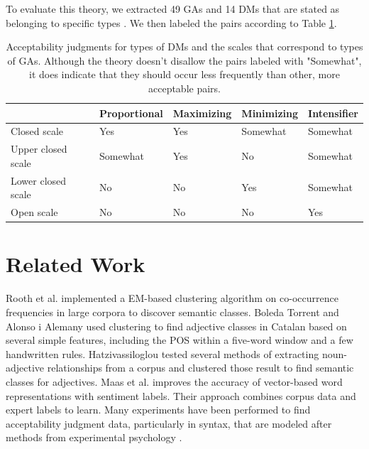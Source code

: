 \documentclass[11pt]{article}
\begin{document}
To evaluate this theory, we extracted 49 GAs and 14 DMs that are stated as belonging to specific types \cite{kennedymcnally} \cite{kennedy07}. We then labeled the pairs according to Table \ref{tab:theory-table}.

\begin{center}
\begin{table}[ht]
\hfill{}
\begin{tabular}{|l|l|l|l|l|}
\hline & \bf Proportional & \bf Maximizing & \bf Minimizing & \bf Intensifier \\ \hline
Closed scale & Yes & Yes & Somewhat & Somewhat \\ \hline
Upper closed scale & Somewhat & Yes & No & Somewhat \\ \hline
Lower closed scale & No & No & Yes & Somewhat \\ \hline
Open scale & No & No & No & Yes \\ \hline
\end{tabular}
\hfill{}
\caption{\label{tab:theory-table} Acceptability judgments for types of DMs and the scales that correspond to types of GAs. Although the theory doesn't disallow the pairs labeled with "Somewhat", it does indicate that they should occur less frequently than other, more acceptable pairs.}
\end{table}
\end{center}

\section{Related Work}

Rooth et al.  implemented a EM-based clustering algorithm on co-occurrence frequencies in large corpora to discover semantic classes. Boleda Torrent and Alonso i Alemany  used clustering to find adjective classes in Catalan based on several simple features, including the POS within a five-word window and a few handwritten rules. Hatzivassiloglou  tested several methods of extracting noun-adjective relationships from a corpus and clustered those result to find semantic classes for adjectives. Maas et al.  improves the accuracy of vector-based word representations with sentiment labels. Their approach combines corpus data and expert labels to learn. Many experiments have been performed to find acceptability judgment data, particularly in syntax, that are modeled after methods from experimental psychology \cite{sprouse}.
\end{document}
